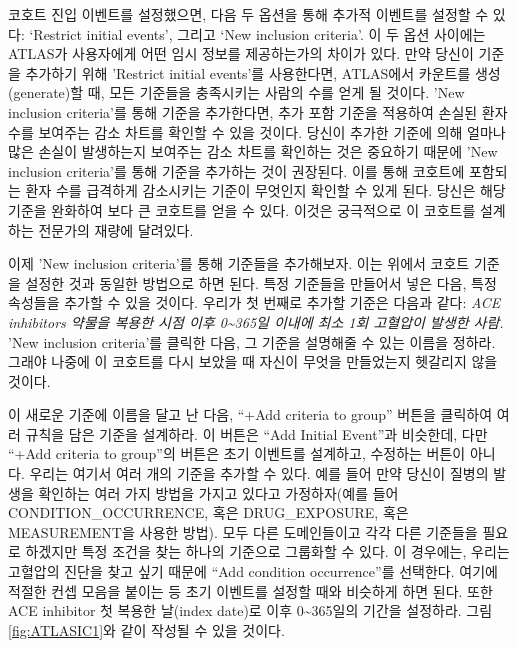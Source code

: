 \documentclass[11pt]{book}
\theoremstyle{definition}
\theoremstyle{definition}
\theoremstyle{definition}
\theoremstyle{remark}
\begin{document}
코호트 진입 이벤트를 설정했으면, 다음 두 옵션을 통해 추가적 이벤트를
설정할 수 있다: `Restrict initial events', 그리고 `New inclusion
criteria'. 이 두 옵션 사이에는 ATLAS가 사용자에게 어떤 임시 정보를
제공하는가의 차이가 있다. 만약 당신이 기준을 추가하기 위해 'Restrict
initial events'를 사용한다면, ATLAS에서 카운트를 생성(generate)할 때,
모든 기준들을 충족시키는 사람의 수를 얻게 될 것이다. 'New inclusion
criteria'를 통해 기준을 추가한다면, 추가 포함 기준을 적용하여 손실된
환자 수를 보여주는 감소 차트를 확인할 수 있을 것이다. 당신이 추가한
기준에 의해 얼마나 많은 손실이 발생하는지 보여주는 감소 차트를 확인하는
것은 중요하기 때문에 'New inclusion criteria'를 통해 기준을 추가하는
것이 권장된다. 이를 통해 코호트에 포함되는 환자 수를 급격하게 감소시키는
기준이 무엇인지 확인할 수 있게 된다. 당신은 해당 기준을 완화하여 보다 큰
코호트를 얻을 수 있다. 이것은 궁극적으로 이 코호트를 설계하는 전문가의
재량에 달려있다.

이제 'New inclusion criteria'를 통해 기준들을 추가해보자. 이는 위에서
코호트 기준을 설정한 것과 동일한 방법으로 하면 된다. 특정 기준들을
만들어서 넣은 다음, 특정 속성들을 추가할 수 있을 것이다. 우리가 첫
번째로 추가할 기준은 다음과 같다: \emph{ACE inhibitors 약물을 복용한
시점 이후 0\textasciitilde{}365일 이내에 최소 1회 고혈압이 발생한 사람.}
'New inclusion criteria'를 클릭한 다음, 그 기준을 설명해줄 수 있는
이름을 정하라. 그래야 나중에 이 코호트를 다시 보았을 때 자신이 무엇을
만들었는지 헷갈리지 않을 것이다.

이 새로운 기준에 이름을 달고 난 다음, ``+Add criteria to group'' 버튼을
클릭하여 여러 규칙을 담은 기준을 설계하라. 이 버튼은 ``Add Initial
Event''과 비슷한데, 다만 ``+Add criteria to group''의 버튼은 초기
이벤트를 설계하고, 수정하는 버튼이 아니다. 우리는 여기서 여러 개의
기준을 추가할 수 있다. 예를 들어 만약 당신이 질병의 발생을 확인하는 여러
가지 방법을 가지고 있다고 가정하자(예를 들어 CONDITION\_OCCURRENCE, 혹은
DRUG\_EXPOSURE, 혹은 MEASUREMENT을 사용한 방법). 모두 다른 도메인들이고
각각 다른 기준들을 필요로 하겠지만 특정 조건을 찾는 하나의 기준으로
그룹화할 수 있다. 이 경우에는, 우리는 고혈압의 진단을 찾고 싶기 때문에
``Add condition occurrence''를 선택한다. 여기에 적절한 컨셉 모음을
붙이는 등 초기 이벤트를 설정할 때와 비슷하게 하면 된다. 또한 ACE
inhibitor 첫 복용한 날(index date)로 이후 0\textasciitilde{}365일의
기간을 설정하라. 그림 \ref{fig:ATLASIC1}와 같이 작성될 수 있을 것이다.
\end{document}
